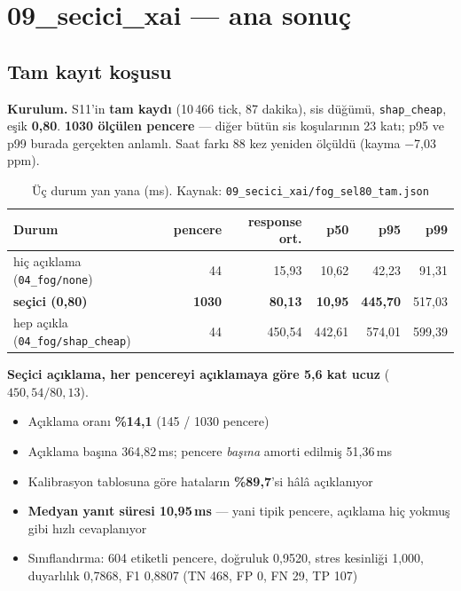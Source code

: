 \documentclass[11pt,a4paper]{report}
\newcommand{\ms}{\,ms}
\newcommand{\kod}[1]{\texttt{\small #1}}
\newcommand{\dosya}[1]{\texttt{\footnotesize #1}}
\begin{document}
\section{09\_secici\_xai --- ana sonuç}
\label{sec:secici}

\subsection{Tam kayıt koşusu}

\textbf{Kurulum.} S11'in \textbf{tam kaydı} (10\,466 tick, 87 dakika), sis
düğümü, \kod{shap\_cheap}, eşik \textbf{0{,}80}. \textbf{1030 ölçülen pencere}
--- diğer bütün sis koşularının 23 katı; p95 ve p99 burada gerçekten anlamlı.
Saat farkı 88 kez yeniden ölçüldü (kayma $-$7{,}03 ppm).

\begin{table}[H]
\centering\small
\begin{tabular}{@{}lrrrrr@{}}
\toprule
\textbf{Durum} & \textbf{pencere} & \textbf{response ort.} & \textbf{p50} & \textbf{p95} & \textbf{p99} \\
\midrule
hiç açıklama (\kod{04\_fog/none}) & 44 & 15{,}93 & 10{,}62 & 42{,}23 & 91{,}31 \\
\textbf{seçici (0{,}80)}          & \textbf{1030} & \textbf{80{,}13} & \textbf{10{,}95} & \textbf{445{,}70} & 517{,}03 \\
hep açıkla (\kod{04\_fog/shap\_cheap}) & 44 & 450{,}54 & 442{,}61 & 574{,}01 & 599{,}39 \\
\bottomrule
\end{tabular}
\caption{Üç durum yan yana (ms).
Kaynak: \dosya{09\_secici\_xai/fog\_sel80\_tam.json}}
\end{table}

\begin{bulgu}
\textbf{Seçici açıklama, her pencereyi açıklamaya göre 5{,}6 kat ucuz}
($450{,}54 / 80{,}13$).
\begin{itemize}[nosep,leftmargin=1.4em]
\item Açıklama oranı \textbf{\%14{,}1} (145 / 1030 pencere)
\item Açıklama başına 364{,}82\ms; pencere \emph{başına} amorti edilmiş
       51{,}36\ms
\item Kalibrasyon tablosuna göre hataların \textbf{\%89{,}7}'si hâlâ açıklanıyor
\item \textbf{Medyan yanıt süresi 10{,}95\ms} --- yani tipik pencere,
      açıklama hiç yokmuş gibi hızlı cevaplanıyor
\item Sınıflandırma: 604 etiketli pencere, doğruluk 0{,}9520, stres kesinliği
      1{,}000, duyarlılık 0{,}7868, F1 0{,}8807 (TN 468, FP 0, FN 29, TP 107)
\end{itemize}
\end{bulgu}
\end{document}
